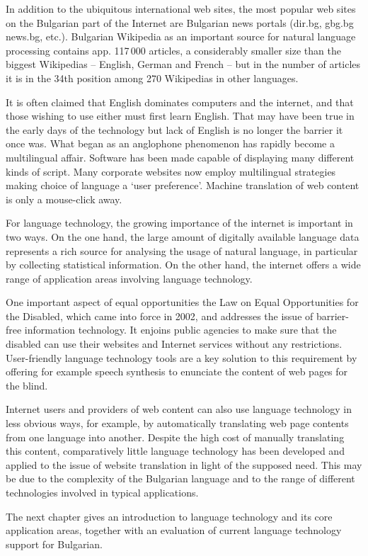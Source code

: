 \documentclass[]{../../metanetpaper}
\begin{document}
\begin{multicols}{2}
In addition to the ubiquitous international web sites, the most popular web sites on the Bulgarian part of the Internet are Bulgarian news portals (dir.bg, gbg.bg news.bg, etc.). Bulgarian Wikipedia as an important source for natural language processing contains app. 117\,000 articles, a considerably smaller size than the biggest Wikipedias – English, German and French – but in the number of articles it is in the 34th position \cite{metadata} among 270 Wikipedias in other languages. 

It is often claimed that English dominates computers and the internet, and that those wishing to use either must first learn English. That may have been true in the early days of the technology but lack of English is no longer the barrier it once was. What began as an anglophone phenomenon has rapidly become a multilingual affair. Software has been made capable of displaying many different kinds of script. Many corporate websites now employ multilingual strategies making choice of language a ‘user preference’. Machine translation of web content is only a mouse-click away.

For language technology, the growing importance of the internet is important in two ways. On the one hand, the large amount of digitally available language data represents a rich source for analysing the usage of natural language, in particular by collecting statistical information. On the other hand, the internet offers a wide range of application areas involving language technology. 

One important aspect of equal opportunities the Law on Equal Opportunities for the Disabled, which came into force in 2002, and addresses the issue of barrier-free information technology. It enjoins public agencies to make sure that the disabled can use their websites and Internet services without any restrictions. User-friendly language technology tools are a key solution to this requirement by offering for example speech synthesis to enunciate the content of web pages for the blind.

Internet users and providers of web content can also use language technology in less obvious ways, for example, by automatically translating web page contents from one language into another. Despite the high cost of manually translating this content, comparatively little language technology has been developed and applied to the issue of website translation in light of the supposed need. This may be due to the complexity of the Bulgarian language and to the range of different technologies involved in typical applications.

The next chapter gives an introduction to language technology and its core application areas, together with an evaluation of current language technology support for Bulgarian. 
\end{multicols}
\end{document}
